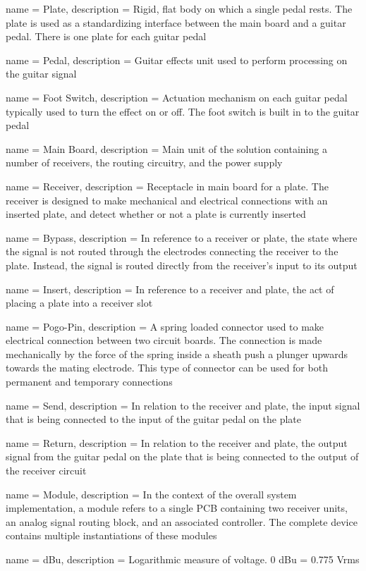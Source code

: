  {
	name = Plate,
	description = {Rigid, flat body on which a single pedal rests.  The plate is used as a standardizing interface between the main board and a guitar pedal.  There is one plate for each guitar pedal}
}

 {
	name = Pedal,
	description = {Guitar effects unit used to perform processing on the guitar signal}
}

 {
	name = {Foot Switch},
	description = {Actuation mechanism on each guitar pedal typically used to turn the effect on or off.  The foot switch is built in to the guitar pedal}
}

 {
	name = {Main Board},
	description = {Main unit of the solution containing a number of receivers, the routing circuitry, and the power supply}
}

 {
	name = {Receiver},
	description = {Receptacle in main board for a plate.  The receiver is designed to make mechanical and electrical connections with an inserted plate, and detect whether or not a plate is currently inserted}
}

 {
	name = {Bypass},
	description = {In reference to a receiver or plate, the state where the signal is not routed through the electrodes connecting the receiver to the plate.  Instead, the signal is routed directly from the receiver's input to its output}
}

 {
	name = {Insert},
	description = {In reference to a receiver and plate, the act of placing a plate into a receiver slot}
}

 {
	name = {Pogo-Pin}, 
	description = {A spring loaded connector used to make electrical connection between two circuit boards.  The connection is made mechanically by the force of the spring inside a sheath push a plunger upwards towards the mating electrode.  This type of connector can be used for both permanent and temporary connections}
}

 {
	name = {Send},
	description = {In relation to the receiver and plate, the input signal that is being connected to the input of the guitar pedal on the plate}
}

 {
	name = {Return},
	description = {In relation to the receiver and plate, the output signal from the guitar pedal on the plate that is being connected to the output of the receiver circuit}
}

 {
	name = {Module},
	description = {In the context of the overall system implementation, a module refers to a single PCB containing two receiver units, an analog signal routing block, and an associated controller.  The complete device contains multiple instantiations of these modules}
}

 {
	name = {dBu},
	description = {Logarithmic measure of voltage.  0 dBu = 0.775 Vrms}
}